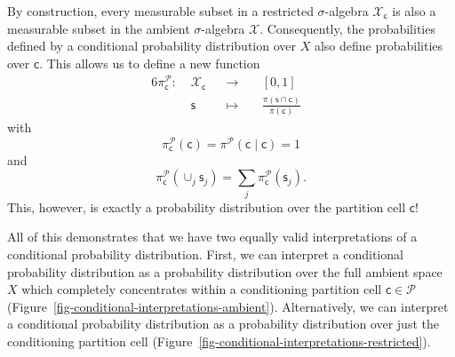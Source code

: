 \documentclass[
  letterpaper,
  DIV=11,
  numbers=noendperiod]{scrartcl}
\begin{document}
By construction, every measurable subset in a restricted
\(\sigma\)-algebra \(\mathcal{X}_{\mathsf{c}}\) is also a measurable
subset in the ambient \(\sigma\)-algebra \(\mathcal{X}\). Consequently,
the probabilities defined by a conditional probability distribution over
\(X\) also define probabilities over \(\mathsf{c}\). This allows us to
define a new function \begin{alignat*}{6}
\pi^{\mathcal{P}}_{\mathsf{c}}
:\; &\mathcal{X}_{\mathsf{c}}& &\rightarrow& \; &[0, 1]&
\\
&\mathsf{s}& &\mapsto&
&\frac{ \pi(\mathsf{s} \cap \mathsf{c}) }{ \pi (\mathsf{c}) }&
\end{alignat*} with \[
\pi^{\mathcal{P}}_{\mathsf{c}}( \mathsf{c} )
= \pi^{\mathcal{P}}( \mathsf{c} \mid \mathsf{c} )
= 1
\] and \[
\pi^{\mathcal{P}}_{\mathsf{c}}( \cup_{j} \mathsf{s}_{j} )
= \sum_{j} \pi^{\mathcal{P}}_{\mathsf{c}}( \mathsf{s}_{j} ).
\] This, however, is exactly a probability distribution over the
partition cell \(\mathsf{c}\)!

All of this demonstrates that we have two equally valid interpretations
of a conditional probability distribution. First, we can interpret a
conditional probability distribution as a probability distribution over
the full ambient space \(X\) which completely concentrates within a
conditioning partition cell \(\mathsf{c} \in \mathcal{P}\)
(Figure~\ref{fig-conditional-interpretations-ambient}). Alternatively,
we can interpret a conditional probability distribution as a probability
distribution over just the conditioning partition cell
(Figure~\ref{fig-conditional-interpretations-restricted}).
\end{document}
